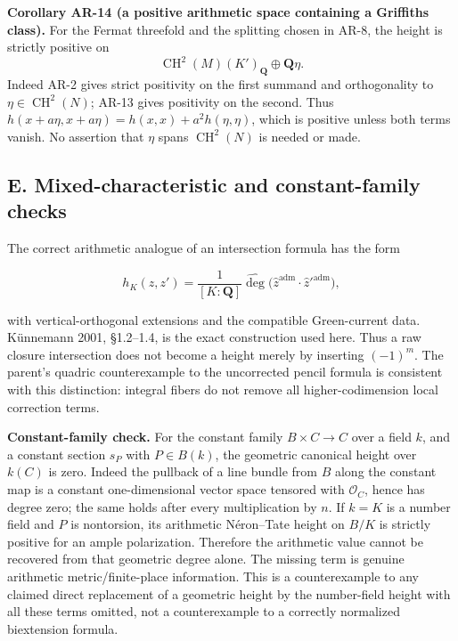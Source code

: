 \textbf{Corollary AR-14 (a positive arithmetic space containing a
Griffiths class).} For the Fermat threefold and the splitting chosen in
AR-8, the height is strictly positive on \[
\operatorname{CH}^2(M)(K')_{\mathbf Q}\oplus\mathbf Q\eta.
\] Indeed AR-2 gives strict positivity on the first summand and
orthogonality to \(\eta\in\operatorname{CH}^2(N)\); AR-13 gives
positivity on the second. Thus
\(h(x+a\eta,x+a\eta)=h(x,x)+a^2h(\eta,\eta)\), which is positive unless
both terms vanish. No assertion that \(\eta\) spans
\(\operatorname{CH}^2(N)\) is needed or made.

\subsection{E. Mixed-characteristic and constant-family
checks}\label{e.-mixed-characteristic-and-constant-family-checks}

The correct arithmetic analogue of an intersection formula has the form

\[
h_K(z,z')=\frac1{[K:\mathbf Q]}\widehat{\deg}
 \bigl(\widehat z^{\mathrm{adm}}\cdot\widehat z'^{\mathrm{adm}}\bigr),
\tag{AR.6}
\]

with vertical-orthogonal extensions and the compatible Green-current
data. Künnemann 2001, §1.2--1.4, is the exact construction used here.
Thus a raw closure intersection does not become a height merely by
inserting \((-1)^m\). The parent's quadric counterexample to the
uncorrected pencil formula is consistent with this distinction: integral
fibers do not remove all higher-codimension local correction terms.

\textbf{Constant-family check.} For the constant family
\(B\times C\to C\) over a field \(k\), and a constant section \(s_P\)
with \(P\in B(k)\), the geometric canonical height over \(k(C)\) is
zero. Indeed the pullback of a line bundle from \(B\) along the constant
map is a constant one-dimensional vector space tensored with
\(\mathcal O_C\), hence has degree zero; the same holds after every
multiplication by \(n\). If \(k=K\) is a number field and \(P\) is
nontorsion, its arithmetic Néron--Tate height on \(B/K\) is strictly
positive for an ample polarization. Therefore the arithmetic value
cannot be recovered from that geometric degree alone. The missing term
is genuine arithmetic metric/finite-place information. This is a
counterexample to any claimed direct replacement of a geometric height
by the number-field height with all these terms omitted, not a
counterexample to a correctly normalized biextension formula.

